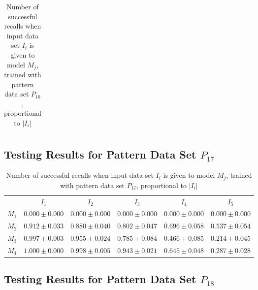 \documentclass[12pt]{article}
\begin{document}
\begin{appendices}
\begin{table}[H]
\begin{tabular}{cccccc}
    \end{tabular}
    \caption{Number of successful recalls when input data set $I_i$ is given to model $M_j$, trained with pattern data set $P_{16}$, proportional to $\left|I_i\right|$}
    \end{table}
    
\subsection{Testing Results for Pattern Data Set $P_{17}$}


    \begin{table}[H]
    \centering
    \def\arraystretch{1.5}
    \footnotesize
    \begin{tabular}{cccccc}
    
 & $I_{1}$  & $I_{2}$  & $I_{3}$  & $I_{4}$  & $I_{5}$ \\ \cline{2-6}
$M_{1}$  & $0.000\pm0.000$  & $0.000\pm0.000$  & $0.000\pm0.000$  & $0.000\pm0.000$  & $0.000\pm0.000$ \\
$M_{2}$  & $0.912\pm0.033$  & $0.880\pm0.040$  & $0.802\pm0.047$  & $0.696\pm0.058$  & $0.537\pm0.054$ \\
$M_{3}$  & $0.997\pm0.003$  & $0.955\pm0.024$  & $0.785\pm0.084$  & $0.466\pm0.085$  & $0.214\pm0.045$ \\
$M_{4}$  & $1.000\pm0.000$  & $0.998\pm0.005$  & $0.943\pm0.021$  & $0.645\pm0.048$  & $0.287\pm0.028$ \\

    \end{tabular}
    \caption{Number of successful recalls when input data set $I_i$ is given to model $M_j$, trained with pattern data set $P_{17}$, proportional to $\left|I_i\right|$}
    \end{table}
    
\subsection{Testing Results for Pattern Data Set $P_{18}$}


    \begin{table}[H]
    \centering
    \def\arraystretch{1.5}
    \footnotesize
    \begin{tabular}{cccccc}
    

\end{tabular}
\end{table}
\end{appendices}
\end{document}

